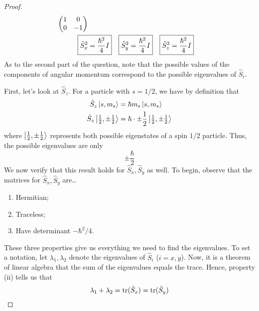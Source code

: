\documentclass[../psets.tex]{subfiles}
\begin{document}
\begin{enumerate}
\begin{enumerate}
\begin{proof}
\begin{align*}
                        \begin{pmatrix}
                            1 & 0\\
                            0 & -1\\
                        \end{pmatrix}\\
                \Aboxed{\hat{S}_x^2 &= \frac{\hbar^2}{4}I}&
                    \Aboxed{\hat{S}_y^2 &= \frac{\hbar^2}{4}I}&
                        \Aboxed{\hat{S}_z^2 &= \frac{\hbar^2}{4}I}
            \end{align*}
            As to the second part of the question, note that the possible values of the components of angular momentum correspond to the possible eigenvalues of $\hat{S}_i$.\par
            First, let's look at $\hat{S}_z$. For a particle with $s=1/2$, we have by definition that
            \begin{align*}
                \hat{S}_z\ket{s,m_s} &= \hbar m_s\ket{s,m_s}\\
                \hat{S}_z\ket{\tfrac{1}{2},\pm\tfrac{1}{2}} &= \hbar\cdot\pm\frac{1}{2}\ket{\tfrac{1}{2},\pm\tfrac{1}{2}}
            \end{align*}
            where $\ket{\tfrac{1}{2},\pm\tfrac{1}{2}}$ represents both possible eigenstates of a spin $1/2$ particle. Thus, the possible eigenvalues are only
            \begin{equation*}
                \boxed{\pm\frac{\hbar}{2}}
            \end{equation*}
            We now verify that this result holds for $\hat{S}_x,\hat{S}_y$ as well. To begin, observe that the matrices for $\hat{S}_x,\hat{S}_y$ are\dots
            \begin{enumerate}
                \item Hermitian;
                \item Traceless;
                \item Have determinant $-\hbar^2/4$.
            \end{enumerate}
            These three properties give us everything we need to find the eigenvalues. To set a notation, let $\lambda_1,\lambda_2$ denote the eigenvalues of $\hat{S}_i$ ($i=x,y$). Now, it is a theorem of linear algebra that the sum of the eigenvalues equals the trace. Hence, property (ii) tells us that
            \begin{equation*}
                \lambda_1+\lambda_2 = {\tr}(\hat{S}_x)
                = {\tr}(\hat{S}_y)

\end{equation*}
\end{proof}
\end{enumerate}
\end{enumerate}
\end{document}
